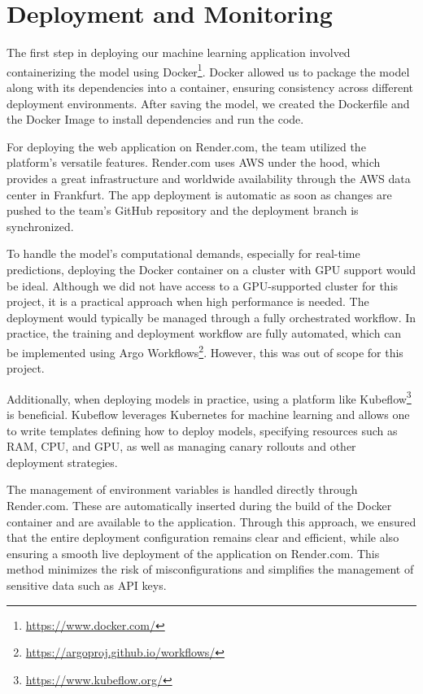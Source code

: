 \section{Deployment and Monitoring}
The first step in deploying our machine learning application involved containerizing
the model using Docker\footnote{\url{https://www.docker.com/}}. Docker
allowed us to package the model along with its dependencies into a
container, ensuring consistency across different deployment environments.
After saving the model, we created the Dockerfile and the Docker Image to
install dependencies and run the code.

For deploying the web application on Render.com, the team
utilized the platform's versatile features. Render.com uses
\ac{AWS} under the hood, which provides
a great infrastructure and worldwide availability through
the \ac{AWS} data center in Frankfurt. The app deployment is automatic as
soon as changes are pushed to the team's GitHub repository and the
deployment branch is synchronized.

To handle the model's computational demands, especially for real-time
predictions, deploying the Docker container on a cluster with GPU support
would be ideal. Although we did not have access to a GPU-supported cluster
for this project, it is a practical approach when high performance is needed.
The deployment would typically be managed through a fully orchestrated workflow.
In practice, the training and deployment workflow are fully automated,
which can be implemented using Argo Workflows\footnote{\url{https://argoproj.github.io/workflows/}}.
However, this was out of scope for this project.

Additionally, when deploying models in practice, using a platform like
Kubeflow\footnote{\url{https://www.kubeflow.org/}} is beneficial. Kubeflow
leverages Kubernetes for machine learning and allows one to write templates
defining how to deploy models, specifying resources such as RAM, CPU, and GPU,
as well as managing canary rollouts and other deployment strategies.

The management of environment variables is handled directly through Render.com.
These are automatically inserted during the build of the Docker container and
are available to the application. Through this approach, we ensured that
the entire deployment configuration remains clear and efficient, while also
ensuring a smooth live deployment of the application on Render.com. This
method minimizes the risk of misconfigurations and simplifies the management
of sensitive data such as API keys.

